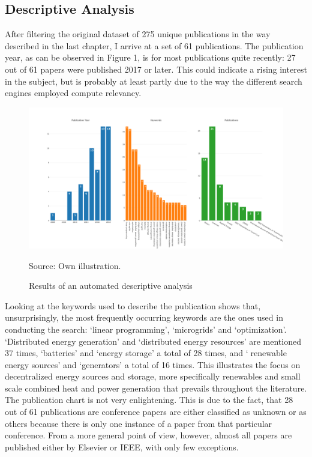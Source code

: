 \documentclass[
	11pt,								%
	DIV10,								%
	a4paper,         					%
	oneside,							%
	headheight=20pt,					%
	footheight=20pt,					%
    parskip=full,						%
    listof=totoc,						%
	bibliography=totoc,					%
	index=totoc,						%
]{scrartcl}
\begin{document}
\subsection{Descriptive Analysis}
After filtering the original dataset of 275 unique publications in the way described in the last chapter, I arrive at a set of 61 publications. The publication year, as can be observed in Figure 1, is for most publications quite recently: 27 out of 61 papers were published 2017 or later. This could indicate a rising interest in the subject, but is probably at least partly due to the way the different search engines employed compute relevancy.  
\begin{figure}[H]
	\centering
	\includegraphics[width=\textwidth]{pictures/Figure_1.png}
	\caption{Results of an automated descriptive analysis}
	\label{descriptive_anaylsis_results}
	\flushleft\quad\quad\footnotesize{Source: Own illustration.}
\end{figure}	
Looking at the keywords used to describe the publication shows that, unsurprisingly, the most frequently occurring keywords are the ones used in conducting the search: `linear programming', `microgrids' and `optimization'. `Distributed energy generation' and `distributed energy resources' are mentioned 37 times, `batteries' and `energy storage' a total of 28 times, and `renewable energy sources' and `generators' a total of 16 times. This illustrates the focus on decentralized energy sources and storage, more specifically renewables and small scale combined heat and power generation that prevails throughout the literature.
\\
The publication chart is not very enlightening. This is due to the fact, that 28 out of 61 publications are conference papers are either classified as unknown or as others because there is only one instance of a paper from that particular conference. From a more general point of view, however, almost all papers are published either by Elsevier or IEEE, with only few exceptions.
\end{document}
